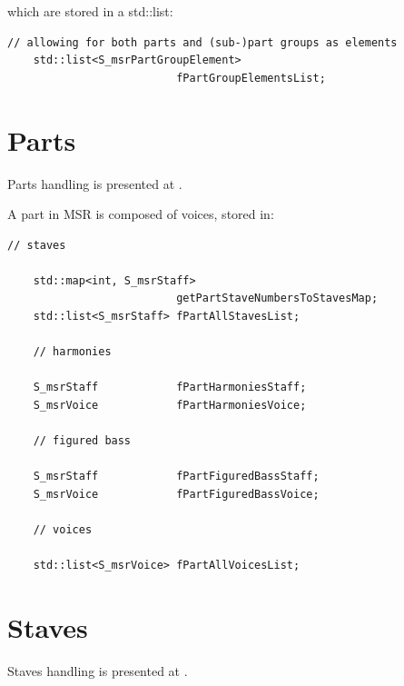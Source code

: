 which are stored in a std::list:
\begin{lstlisting}[language=CPlusPlus]
    // allowing for both parts and (sub-)part groups as elements
    std::list<S_msrPartGroupElement>
                          fPartGroupElementsList;
\end{lstlisting}


\section{Parts}\label{Parts}

Parts handling is presented at .

A part in MSR is composed of voices, stored in:
\begin{lstlisting}[language=CPlusPlus]
    // staves

    std::map<int, S_msrStaff>
                          getPartStaveNumbersToStavesMap;
    std::list<S_msrStaff> fPartAllStavesList;

    // harmonies

    S_msrStaff            fPartHarmoniesStaff;
    S_msrVoice            fPartHarmoniesVoice;

    // figured bass

    S_msrStaff            fPartFiguredBassStaff;
    S_msrVoice            fPartFiguredBassVoice;

    // voices

    std::list<S_msrVoice> fPartAllVoicesList;
\end{lstlisting}


\section{Staves}\label{Staves}

Staves handling is presented at .

